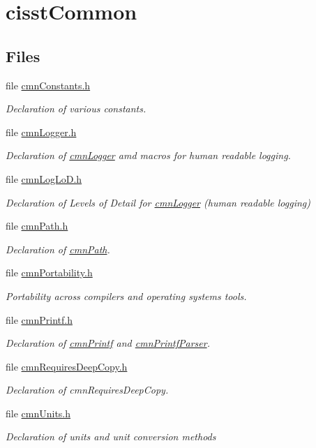 \hypertarget{group__cisst_common}{}\section{cisst\+Common}
\label{group__cisst_common}
\subsection*{Files}
\begin{DoxyCompactItemize}
\item 
file \hyperlink{cmn_constants_8h}{cmn\+Constants.\+h}
\begin{DoxyCompactList}\small\item\em Declaration of various constants. \end{DoxyCompactList}\item 
file \hyperlink{cmn_logger_8h}{cmn\+Logger.\+h}
\begin{DoxyCompactList}\small\item\em Declaration of \hyperlink{classcmn_logger}{cmn\+Logger} amd macros for human readable logging. \end{DoxyCompactList}\item 
file \hyperlink{cmn_log_lo_d_8h}{cmn\+Log\+Lo\+D.\+h}
\begin{DoxyCompactList}\small\item\em Declaration of Levels of Detail for \hyperlink{classcmn_logger}{cmn\+Logger} (human readable logging) \end{DoxyCompactList}\item 
file \hyperlink{cmn_path_8h}{cmn\+Path.\+h}
\begin{DoxyCompactList}\small\item\em Declaration of \hyperlink{classcmn_path}{cmn\+Path}. \end{DoxyCompactList}\item 
file \hyperlink{cmn_portability_8h}{cmn\+Portability.\+h}
\begin{DoxyCompactList}\small\item\em Portability across compilers and operating systems tools. \end{DoxyCompactList}\item 
file \hyperlink{cmn_printf_8h}{cmn\+Printf.\+h}
\begin{DoxyCompactList}\small\item\em Declaration of \hyperlink{classcmn_printf}{cmn\+Printf} and \hyperlink{classcmn_printf_parser}{cmn\+Printf\+Parser}. \end{DoxyCompactList}\item 
file \hyperlink{cmn_requires_deep_copy_8h}{cmn\+Requires\+Deep\+Copy.\+h}
\begin{DoxyCompactList}\small\item\em Declaration of cmn\+Requires\+Deep\+Copy. \end{DoxyCompactList}\item 
file \hyperlink{cmn_units_8h}{cmn\+Units.\+h}
\begin{DoxyCompactList}\small\item\em Declaration of units and unit conversion methods


\end{DoxyCompactList}
\end{DoxyCompactItemize}
